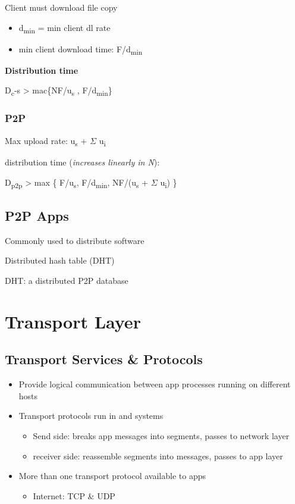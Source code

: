 \documentclass[11pt]{article}
\begin{document}
Client must download file copy
\begin{itemize}
\item d\textsubscript{min} = min client dl rate
\item min client download time: F/d\textsubscript{min}
\end{itemize}

\textbf{Distribution time}

D\textsubscript{c}-s > mac\{NF/u\textsubscript{s} , F/d\textsubscript{min}\}

\subsubsection{P2P}
\label{sec:org29154e4}

Max upload rate:  u\textsubscript{s} + \(\Sigma\) u\textsubscript{i}

distribution time (\emph{increases linearly in N}):

D\textsubscript{p2p} > max \{ F/u\textsubscript{s}, F/d\textsubscript{min}, NF/(u\textsubscript{s} + \(\Sigma\) u\textsubscript{i}) \}





\subsection{P2P Apps}
\label{sec:org7dc2c17}
Commonly used to distribute software

Distributed hash table (DHT)

DHT: a distributed P2P database


\section{Transport Layer}
\label{sec:org165c73b}

\subsection{Transport Services \& Protocols}
\label{sec:orgc50c391}
\begin{itemize}
\item Provide logical communication between app processes running on
different hosts
\item Transport protocols run in and systems
\begin{itemize}
\item Send side: breaks app messages into segments, passes to network layer
\item receiver side: reassemble segments into messages, passes to app
layer
\end{itemize}
\item More than one transport protocol available to apps
\begin{itemize}
\item Internet: TCP \& UDP
\end{itemize}
\end{itemize}
\end{document}
